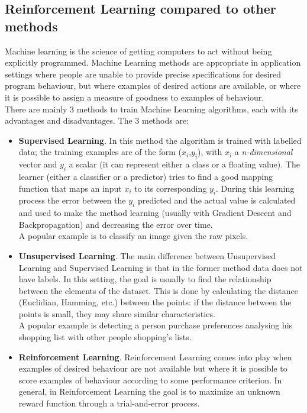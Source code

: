 \documentclass[14pt]{extarticle}
\begin{document}
\begin{flushleft}
\subsection{Reinforcement Learning compared to other methods}
Machine learning is the science of getting computers to act without being explicitly programmed. Machine Learning methods are appropriate in application settings where
people are unable to provide precise specifications for desired program behaviour, but
where examples of desired actions are available, or where it is possible to assign a
measure of goodness to examples of behaviour\cite{RLandSL}.
\\
There are mainly 3 methods to train Machine Learning algorithms, each with its advantages and disadvantages. The 3 methods are:
\begin{itemize}
\item \textbf{Supervised Learning}. In this method the algorithm is trained with labelled data; the training examples are of the form ($x_i$,$y_i$), with $x_i$ a \emph{n-dimensional} vector and $y_i$ a scalar (it can represent either a class or a floating value). The learner (either a classifier or a predictor) tries to find a good mapping function that maps an input $x_i$ to its corresponding $y_i$. During this learning process the error between the $y_i$ predicted and the actual value is calculated and used to make the method learning (usually with Gradient Descent and Backpropagation) and decreasing the error over time. \\
A popular example is to classify an image given the raw pixels.
\item \textbf{Unsupervised Learning}. The main difference between Unsupervised Learning and Supervised Learning is that in the former method data does not have labels. In this setting, the goal is usually to find the relationship between the elements of the dataset. This is done by calculating the distance (Euclidian, Hamming, etc.) between the points: if the distance between the points is small, they may share similar characteristics. \\
A popular example is detecting a person purchase preferences analysing his shopping list with other people shopping's lists.
\item \textbf{Reinforcement Learning}. Reinforcement Learning comes into play when examples of desired behaviour are not available but where it is possible to score examples of behaviour according to some performance criterion\cite{RLandSL}. In general, in Reinforcement Learning the goal is to maximize an unknown reward function through a trial-and-error process. \\

\end{itemize}
\end{flushleft}
\end{document}
